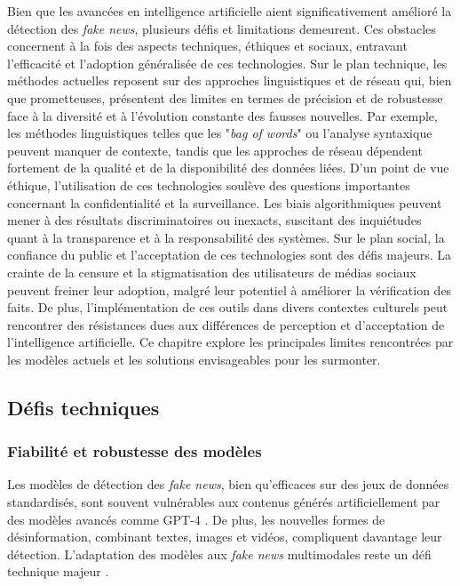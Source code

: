 \documentclass[a4paper,12pt, twocolumn]{article}
\begin{document}
\begin{twocolumn}
Bien que les avancées en intelligence artificielle aient significativement amélioré la détection des \textit{fake news}, plusieurs défis et limitations demeurent. Ces obstacles concernent à la fois des aspects techniques, éthiques et sociaux, entravant l’efficacité et l’adoption généralisée de ces technologies. 
Sur le plan technique, les méthodes actuelles reposent sur des approches linguistiques et de réseau qui, bien que prometteuses, présentent des limites en termes de précision et de robustesse face à la diversité et à l’évolution constante des fausses nouvelles. Par exemple, les méthodes linguistiques telles que les "\textit{bag of words}" ou l'analyse syntaxique peuvent manquer de contexte, tandis que les approches de réseau dépendent fortement de la qualité et de la disponibilité des données liées. 
D'un point de vue éthique, l'utilisation de ces technologies soulève des questions importantes concernant la confidentialité et la surveillance. Les biais algorithmiques peuvent mener à des résultats discriminatoires ou inexacts, suscitant des inquiétudes quant à la transparence et à la responsabilité des systèmes. Sur le plan social, la confiance du public et l'acceptation de ces technologies sont des défis majeurs. La crainte de la censure et la stigmatisation des utilisateurs de médias sociaux peuvent freiner leur adoption, malgré leur potentiel à améliorer la vérification des faits. De plus, l'implémentation de ces outils dans divers contextes culturels peut rencontrer des résistances dues aux différences de perception et d'acceptation de l'intelligence artificielle.
Ce chapitre explore les principales limites rencontrées par les modèles actuels et les solutions envisageables pour les surmonter.

\subsection{Défis techniques}

\subsubsection{Fiabilité et robustesse des modèles}
Les modèles de détection des \textit{fake news}, bien qu’efficaces sur des jeux de données standardisés, sont souvent vulnérables aux contenus générés artificiellement par des modèles avancés comme GPT-4 \cite{hu_bad_2024}. De plus, les nouvelles formes de désinformation, combinant textes, images et vidéos, compliquent davantage leur détection. L’adaptation des modèles aux \textit{fake news} multimodales reste un défi technique majeur \cite{alghamdi_towards_2023, beseiso_context-enhanced_2025}.


\end{twocolumn}
\end{document}
